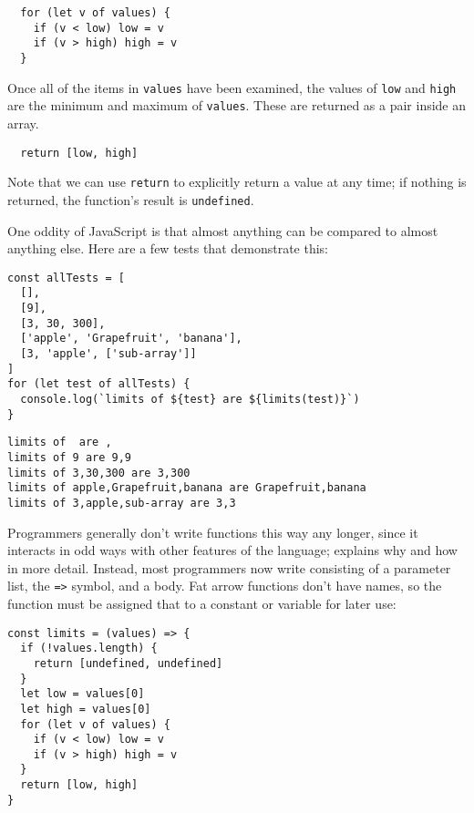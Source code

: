\begin{verbatim}
  for (let v of values) {
    if (v < low) low = v
    if (v > high) high = v
  }
\end{verbatim}

Once all of the items in \texttt{values} have been examined,
the values of \texttt{low} and \texttt{high} are the minimum and maximum of \texttt{values}.
These are returned as a pair inside an array.

\begin{verbatim}
  return [low, high]
\end{verbatim}

\noindent
Note that we can use \texttt{return} to explicitly return a value at any time;
if nothing is returned,
the function's result is \texttt{undefined}.

One oddity of JavaScript is that almost anything can be compared to almost anything else.
Here are a few tests that demonstrate this:

\begin{verbatim}
const allTests = [
  [],
  [9],
  [3, 30, 300],
  ['apple', 'Grapefruit', 'banana'],
  [3, 'apple', ['sub-array']]
]
for (let test of allTests) {
  console.log(`limits of ${test} are ${limits(test)}`)
}
\end{verbatim}

\begin{verbatim}
limits of  are ,
limits of 9 are 9,9
limits of 3,30,300 are 3,300
limits of apple,Grapefruit,banana are Grapefruit,banana
limits of 3,apple,sub-array are 3,3
\end{verbatim}

Programmers generally don't write functions this way any longer,
since it interacts in odd ways with other features of the language;
 explains why and how in more detail.
Instead,
most programmers now write 
consisting of a parameter list,
the \texttt{=\textgreater{}} symbol,
and a body.
Fat arrow functions don't have names,
so the function must be assigned that to a constant or variable for later use:

\begin{verbatim}
const limits = (values) => {
  if (!values.length) {
    return [undefined, undefined]
  }
  let low = values[0]
  let high = values[0]
  for (let v of values) {
    if (v < low) low = v
    if (v > high) high = v
  }
  return [low, high]
}
\end{verbatim}

